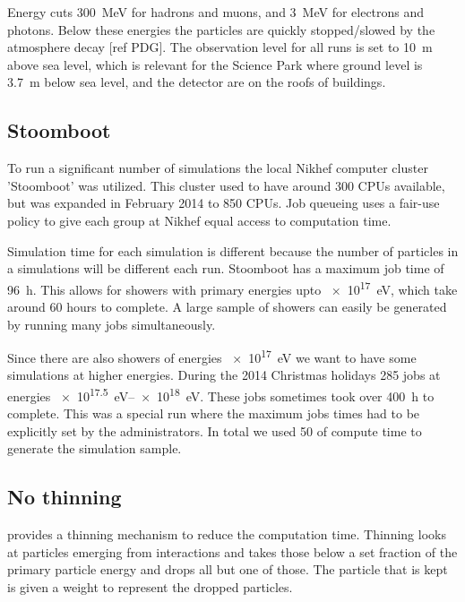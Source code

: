 Energy cuts \SI{300}{\mega\electronvolt} for hadrons and muons, and
\SI{3}{\mega\electronvolt} for electrons and photons. Below these
energies the particles are quickly stopped/slowed by the atmosphere
decay [ref PDG]. The observation level for all runs is set to
\SI{10}{\meter} above sea level, which is relevant for the Science Park
where ground level is \SI{3.7}{\meter} below sea level, and the detector
are on the roofs of buildings.


\subsection{Stoomboot}

To run a significant number of simulations the local Nikhef
computer cluster 'Stoomboot' was utilized. This cluster used to have
around 300 CPUs available, but was expanded in February 2014 to 850
CPUs. Job queueing uses a fair-use policy to give each group at Nikhef
equal access to computation time.

Simulation time for each simulation is different because the number of
particles in a simulations will be different each run. Stoomboot has a
maximum job time of \SI{96}{\hour}. This allows for showers with primary
energies upto \SI{e17}{\electronvolt}, which take around 60 hours to
complete. A large sample of showers can easily be generated by
running many jobs simultaneously.

Since there are also showers of energies \SI{e17}{\electronvolt} we
want to have some simulations at higher energies. During the 2014
Christmas holidays 285 jobs at energies
\SIrange{e17.5}{e18}{\electronvolt}. These jobs sometimes took over
\SI{400}{\hour} to complete. This was a special run where the maximum
jobs times had to be explicitly set by the administrators. In total we
used \SI{50}{\year} of compute time to generate the simulation sample.


\begin{figure}
    \centering
    
    \caption{}
    \label{fig:simulations_shower_walltime}
\end{figure}


\subsection{No thinning}

\corsika provides a thinning mechanism to reduce the computation time.
Thinning looks at particles emerging from interactions and takes those
below a set fraction of the primary particle energy and drops all but
one of those. The particle that is kept is given a weight to represent
the dropped particles.

